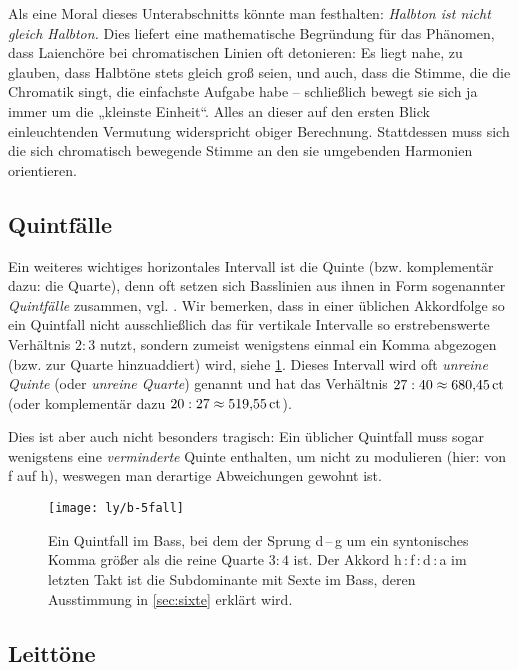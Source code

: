 Als eine Moral dieses Unterabschnitts könnte man festhalten:
\emph{Halbton ist nicht gleich Halbton.}  Dies liefert eine
mathematische Begründung für das Phänomen, dass Laienchöre bei chromatischen
Linien oft detonieren: Es liegt nahe, zu glauben, dass Halbtöne stets
gleich groß seien, und auch, dass die Stimme, die die Chromatik singt, die
einfachste Aufgabe habe – schließlich bewegt sie sich ja immer um die „kleinste
Einheit“. Alles an dieser auf den ersten Blick einleuchtenden Vermutung
widerspricht obiger Berechnung.  Stattdessen muss sich die sich chromatisch
bewegende Stimme an den sie umgebenden Harmonien orientieren.

\subsection{Quintfälle}

Ein weiteres wichtiges horizontales Intervall ist die Quinte (bzw. komplementär
dazu: die Quarte), denn oft setzen sich Basslinien aus ihnen in Form sogenannter
\emph{Quintfälle} zusammen, vgl. \cite[{}12.3]{Skript}. Wir bemerken, dass in
einer üblichen Akkordfolge so ein Quintfall nicht ausschließlich das für
vertikale Intervalle so erstrebenswerte Verhältnis $2:3$ nutzt, sondern zumeist
wenigstens einmal ein Komma abgezogen (bzw. zur Quarte hinzuaddiert) wird, siehe
\cref{fig:5fall}. Dieses Intervall wird oft \emph{unreine Quinte} (oder
\emph{unreine Quarte}) genannt und hat das Verhältnis $27:40 \approx 680{,}45\,\text{ct}$
(oder komplementär dazu $20:27 \approx 519{,}55\,\text{ct}$).

Dies ist aber auch nicht besonders tragisch: Ein üblicher Quintfall muss sogar
wenigstens eine \emph{verminderte} Quinte enthalten, um nicht zu modulieren
(hier: von \naturalp f auf h), weswegen man derartige Abweichungen gewohnt ist.

\begin{figure}[h]
  \centering
  \texttt{[image: ly/b-5fall]}
  \caption{Ein Quintfall im Bass, bei dem der Sprung d\,–\,\naturalp g um ein
    syntonisches Komma größer als die reine Quarte $3:4$ ist.  Der Akkord
    h\,:\,\naturalp f\,:\,d\,:\,a im letzten Takt ist die Subdominante mit Sexte
    im Bass, deren Ausstimmung in \cref{sec:sixte} erklärt wird.}\label{fig:5fall}
\end{figure}

\subsection{Leittöne}
\label{sec:ln}

